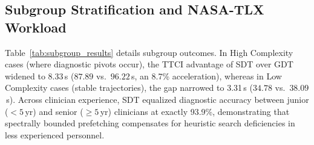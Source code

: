 \documentclass[ijds,dblanonrev]{informs4}
\begin{document}
\subsection{Subgroup Stratification and NASA-TLX Workload}
Table~\ref{tab:subgroup_results} details subgroup outcomes. In High Complexity cases (where diagnostic pivots occur), the TTCI advantage of SDT over GDT widened to 8.33\,s ($87.89$ vs.\ $96.22$\,s, an 8.7\% acceleration), whereas in Low Complexity cases (stable trajectories), the gap narrowed to 3.31\,s ($34.78$ vs.\ $38.09$\,s). Across clinician experience, SDT equalized diagnostic accuracy between junior ($<5$\,yr) and senior ($\ge 5$\,yr) clinicians at exactly 93.9\%, demonstrating that spectrally bounded prefetching compensates for heuristic search deficiencies in less experienced personnel.

\end{document}
